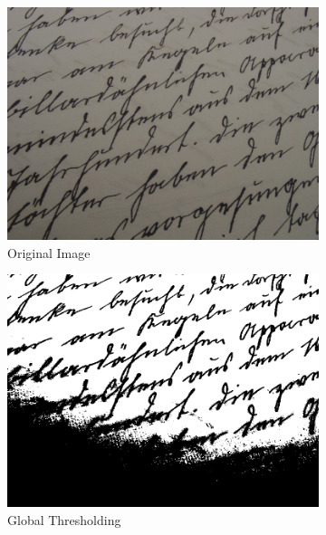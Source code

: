\begin{figure}[H]
    \centering
    \begin{subfigure}{0.33\textwidth}
        \centering
        \includegraphics[width=.99\linewidth]{images/literature/thresholding/original_text}
        \caption{Original Image\cite{website:handwriting_image}}
    \end{subfigure}%
    \begin{subfigure}{.33\textwidth}
        \centering
        \includegraphics[width=.99\linewidth]{images/literature/thresholding/text_global_thresholding}
        \caption{Global Thresholding}
    \end{subfigure}%
    \begin{subfigure}{.33\textwidth}

\end{subfigure}
\end{figure}
